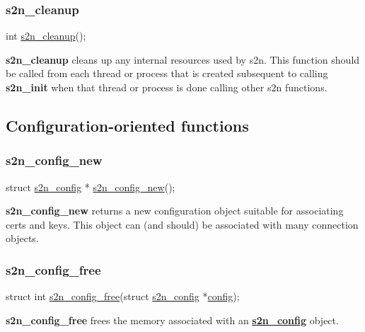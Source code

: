 \subsubsection*{s2n\+\_\+cleanup}


\begin{DoxyCode}
\textcolor{keywordtype}{int} \hyperlink{s2n_8h_a907fdf445e5fb1752f1b18f0ddf935b3}{s2n\_cleanup}();
\end{DoxyCode}


{\bfseries s2n\+\_\+cleanup} cleans up any internal resources used by s2n. This function should be called from each thread or process that is created subsequent to calling {\bfseries s2n\+\_\+init} when that thread or process is done calling other s2n functions.

\subsection*{Configuration-\/oriented functions}

\subsubsection*{s2n\+\_\+config\+\_\+new}


\begin{DoxyCode}
\textcolor{keyword}{struct }\hyperlink{structs2n__config}{s2n\_config} * \hyperlink{s2n_8h_a29ce06d12862218a283abdac554c8e19}{s2n\_config\_new}();
\end{DoxyCode}


{\bfseries s2n\+\_\+config\+\_\+new} returns a new configuration object suitable for associating certs and keys. This object can (and should) be associated with many connection objects.

\subsubsection*{s2n\+\_\+config\+\_\+free}


\begin{DoxyCode}
\textcolor{keyword}{struct }int \hyperlink{s2n_8h_a25b7d82e94f572b657be3936196222c3}{s2n\_config\_free}(struct \hyperlink{structs2n__config}{s2n\_config} *\hyperlink{apps_8h_a67aa6ff0076e9d4fb2b5ad9e6fcb4d89}{config});
\end{DoxyCode}


{\bfseries s2n\+\_\+config\+\_\+free} frees the memory associated with an {\bfseries \hyperlink{structs2n__config}{s2n\+\_\+config}} object.

